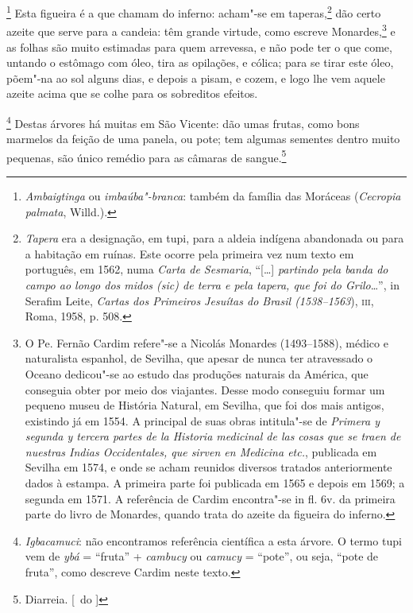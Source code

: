 \begin{linenumbers}
\footnote{ \textit{Ambaigtinga} ou
\textit{imbaúba"-branca}: também da família das Moráceas
(\textit{Cecropia palmata}, Willd.).} Esta figueira é a
que chamam do inferno: acham"-se em taperas,\footnote{ \textit{Tapera}
era a designação, em tupi, para a aldeia indígena abandonada ou para a
habitação em ruínas. Este ocorre pela primeira vez num texto em
português, em 1562, numa \textit{Carta de Sesmaria}, ``[\ldots{}] 
\textit{partindo pela banda do campo ao longo dos midos (sic) de terra
e pela tapera, que foi do Grilo}\ldots{}'', in Serafim Leite,
\textit{Cartas dos Primeiros Jesuítas do Brasil (1538--1563}), \textsc{iii},
Roma, 1958, p. 508.} dão certo azeite que serve para a candeia: têm
grande virtude, como escreve Monardes,\footnote{ O Pe. Fernão Cardim
refere"-se a Nicolás Monardes (1493--1588), médico e naturalista espanhol, de Sevilha, 
que apesar de nunca ter atravessado o Oceano dedicou"-se ao
estudo das produções naturais da América, que conseguia obter por meio
dos viajantes. Desse modo conseguiu formar um pequeno museu de
História Natural, em Sevilha, que foi dos mais antigos, existindo já em
1554. A principal de suas obras intitula"-se de \textit{Primera y
segunda y tercera partes de la Historia medicinal de las cosas que se
traen de nuestras Indias Occidentales, que sirven en Medicina etc.}, 
publicada em Sevilha em 1574, e onde se acham reunidos diversos
tratados anteriormente dados à estampa. A primeira parte foi publicada
em 1565 e depois em 1569; a segunda em 1571. A referência de Cardim
encontra"-se in fl. 6v. da primeira parte do livro de Monardes, quando
trata do azeite da figueira do inferno.} e as folhas são muito
estimadas para quem arrevessa, e não pode ter o que come, untando o
estômago com óleo, tira as opilações, e cólica; para se tirar este
óleo, põem"-na ao sol alguns dias, e depois a pisam, e cozem, e logo lhe
vem aquele azeite acima que se colhe para os sobreditos efeitos. 

\footnote{ \textit{Igbacamuci}: não encontramos
referência científica a esta árvore. O termo tupi vem de
\textit{ybá} = ``fruta'' + \textit{cambucy} ou \textit{camucy} = ``pote'',
ou seja, ``pote de fruta'', como descreve Cardim neste texto.} 
Destas árvores há muitas em São Vicente: dão umas frutas,
como bons marmelos da feição de uma panela, ou pote; tem algumas
sementes dentro muito pequenas, são único remédio para as câmaras de sangue.\footnote{ Diarreia. [~do ]}


\end{linenumbers}
